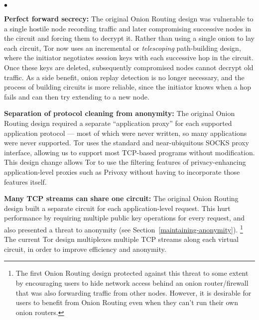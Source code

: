 \documentclass[times,10pt,twocolumn]{article}
\newenvironment{tightlist}{\begin{list}{$\bullet$}{
  \setlength{\itemsep}{0mm}
    \setlength{\parsep}{0mm}
    }}{\end{list}}
\begin{document}
\begin{tightlist}

\item \textbf{Perfect forward secrecy:} The original Onion Routing
design was vulnerable to a single hostile node recording traffic and later
compromising successive nodes in the circuit and forcing them to
decrypt it. 
Rather than using a single onion to lay each circuit,
Tor now uses an incremental or \emph{telescoping}
path-building design, where the initiator negotiates session keys with
each successive hop in the circuit.  Once these keys are deleted,
subsequently compromised nodes cannot decrypt old traffic.
As a side benefit, onion replay detection is no longer
necessary, and the process of building circuits is more reliable, since
the initiator knows when a hop fails and can then try extending to a new node.


\item \textbf{Separation of protocol cleaning from anonymity:}
The original Onion Routing design required a separate ``application
proxy'' for each
supported application protocol --- most
of which were never written, so many applications were never supported.
Tor uses the standard and near-ubiquitous SOCKS
\cite{socks4,socks5} proxy interface, allowing us to support most TCP-based
programs without modification.  This design change allows Tor to
use the filtering features of privacy-enhancing
application-level proxies such as Privoxy without having to
incorporate those features itself.

\item \textbf{Many TCP streams can share one circuit:} The original
Onion Routing design built a separate circuit for each application-level
request.
This hurt performance by requiring multiple public key operations for
every request, and also presented
a threat to anonymity (see Section~\ref{maintaining-anonymity}).
\footnote{The first Onion Routing design \cite{or-ih96} protected against
this threat to some
extent by encouraging users to hide network access behind an onion
router/firewall that was also forwarding traffic from other nodes.
However, it is desirable for users to
benefit from Onion Routing even when they can't run their own 
onion routers.
%
}
The current Tor design multiplexes multiple TCP streams along each virtual
circuit, in order to improve efficiency and anonymity.


\end{tightlist}
\end{document}
